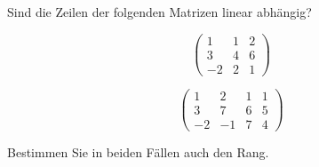 Sind die Zeilen der folgenden Matrizen linear abhängig?
\begin{teilaufgaben}
\item
\[
\begin{pmatrix}
1&1&2\\
3&4&6\\
-2&2&1
\end{pmatrix}
\]
\item
\[
\begin{pmatrix}
1&2&1&1\\
3&7&6&5\\
-2&-1&7&4
\end{pmatrix}
\]
\end{teilaufgaben}
Bestimmen Sie in beiden Fällen auch den Rang.



